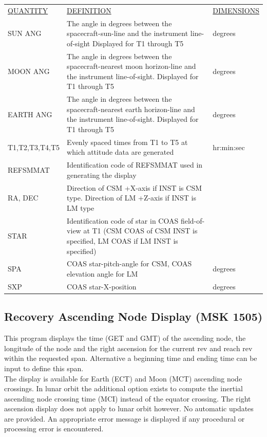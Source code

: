 \documentclass[11pt]{article} %
\begin{document}
\begin{center}
\begin{tabular}{ L{2.4cm} L{7.1cm} L{3cm} }
\underline{QUANTITY} & \underline{DEFINITION} & \underline{DIMENSIONS} \\
SUN ANG&The angle in degrees between the spacecraft-sun-line and the instrument line-of-sight Displayed for T1 through T5&degrees\\
MOON ANG&The angle in degrees between the spacecraft-nearest moon horizon-line and the instrument line-of-sight. Displayed for T1 through T5&degrees\\
EARTH ANG&The angle in degrees between the spacecraft-nearest earth horizon-line and the instrument line-of-sight. Displayed for T1 through T5&degrees\\
T1,T2,T3,T4,T5&Evenly spaced times from T1 to T5 at which attitude data are generated&hr:min:sec\\
REFSMMAT&Identification code of REFSMMAT used in generating the display&\\
RA, DEC&Direction of CSM +X-axis if INST is CSM type. Direction of LM +Z-axis if INST is LM type&\\
STAR&Identification code of star in COAS field-of-view at T1 (CSM COAS of CSM INST is specified, LM COAS if LM INST is specified)&\\
SPA&COAS star-pitch-angle for CSM, COAS elevation angle for LM&degrees\\
SXP&COAS star-X-position&degrees\\
\end{tabular}
\end{center}
\newpage
\subsection{Recovery Ascending Node Display (MSK 1505)}
This program displays the time (GET and GMT) of the ascending node, the longitude of the node and the right ascension for the current rev and reach rev within the requested span. Alternative a beginning time and ending time can be input to define this span.\\

The display is available for Earth (ECT) and Moon (MCT) ascending node crossings. In lunar orbit the additional option exists to compute the inertial ascending node crossing time (MCI) instead of the equator crossing. The right ascension display does not apply to lunar orbit however. No automatic updates are provided. An appropriate error message is displayed if any procedural or processing error is encountered.\\
\end{document}
